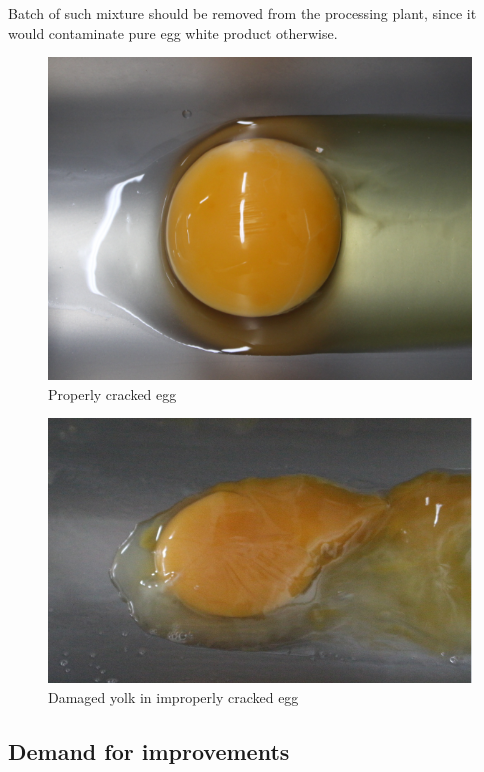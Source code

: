 \documentclass[12pt,twoside,a4paper]{article}
\begin{document}
Batch of such mixture should be removed from  the processing plant, since it would contaminate pure egg white product otherwise. 

\begin{figure}[H]
\centering
\includegraphics[width=0.4\paperwidth]{prop}
\caption{Properly cracked egg}
\end{figure} 

 
\begin{figure}[H]
\centering
\includegraphics[width=0.4\paperwidth]{damg}
\caption{Damaged yolk in improperly cracked egg}
\end{figure}

\subsection{Demand for improvements}
\end{document}
